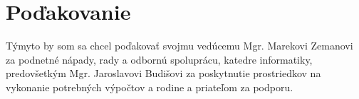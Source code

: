 \chapter{Poďakovanie}
\vfil
Týmyto by som sa chcel poďakovať svojmu vedúcemu Mgr. Marekovi Zemanovi za podnetné nápady, rady a odbornú spoluprácu, katedre informatiky, predovšetkým Mgr. Jaroslavovi Budišovi za poskytnutie prostriedkov na vykonanie potrebných výpočtov a rodine a priateľom za podporu.
